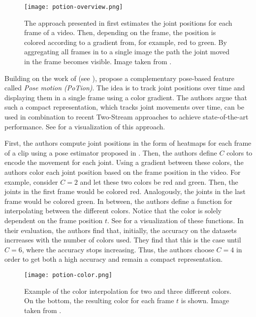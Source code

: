\begin{figure}[htb!]
    \centering
    \texttt{[image: potion-overview.png]}
    \caption{The approach presented in \cite{choutas_potion:_2018} first estimates the joint positions for each frame of a video. Then, depending on the frame, the position is colored according to a gradient from, for example, red to green. By aggregating all frames in to a single image the path the joint moved in the frame becomes visible. Image taken from \cite{choutas_potion:_2018}. }
    \label{fig:potion-overview}
\end{figure}

Building on the work of \cite{simonyan_two-stream_2014} (see ), \cite{choutas_potion:_2018} propose a complementary pose-based feature called \textit{Pose motion (PoTion)}.
The idea is to track joint positions over time and displaying them in a single frame using a color gradient.
The authors argue that such a compact representation, which tracks joint movements over time, can be used in combination to recent Two-Stream approaches to achieve state-of-the-art performance.
See  for a visualization of this approach.

First, the authors compute joint positions in the form of heatmaps for each frame of a clip using a pose estimator proposed in \cite{cao_realtime_2017}.
Then, the authors define $C$ colors to encode the movement for each joint.
Using a gradient between these colors, the authors color each joint position based on the frame position in the video.
For example, consider $C=2$ and let these two colors be red and green.
Then, the joints in the first frame would be colored red.
Analogously, the joints in the last frame would be colored green.
In between, the authors define a function for interpolating between the different colors.
Notice that the color is solely dependent on the frame position $t$.
See  for a visualization of these functions. 
In their evaluation, the authors find that, initially, the accuracy on the datasets incrreases with the number of colors used.
They find that this is the case until $C=6$, where the accuracy stops increasing.
Thus, the authors choose $C=4$ in order to get both a high accuracy and remain a compact representation.

\begin{figure}[htb!]
    \centering
    \texttt{[image: potion-color.png]}
    \caption{Example of the color interpolation for two and three different colors. On the bottom, the resulting color for each frame $t$ is shown. Image taken from \cite{choutas_potion:_2018}. }
    \label{fig:potion-color}
\end{figure}

